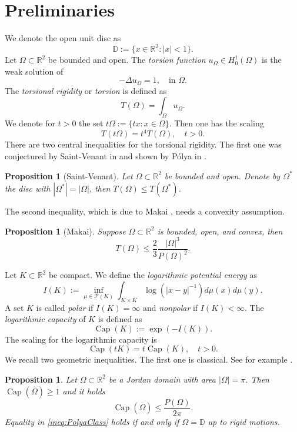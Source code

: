 \documentclass[11pt]{article}
\theoremstyle{plain}
\numberwithin{equation}{section}
\newtheorem{proposition}[theorem]{Proposition}
\theoremstyle{definition}
\DeclareMathOperator{\cp}{Cap}
\def \Om{\Omega}
\def \R {\mathbb{R}}
\def \mc{\mathcal}
\def \mb{\mathbb}
\begin{document}
    \section{Preliminaries}
    We denote the open unit disc as
    \[
    \mb D:=\{x\in \R^2:|x|<1\}.
    \]
    Let $\Om \subset \R^2$ be bounded and open. The \textit{torsion function} $u_\Om \in H^1_0(\Om)$ is the weak solution of
    \[
        -\Delta u_\Om=1,\quad \text{in }\Om.
    \]
    The \textit{torsional rigidity} or \textit{torsion} is defined as
    \[
    T(\Om)=\int_{\Om}u_\Om.
    \]
    We denote for $t>0$ the set $t\Om:=\{tx:x\in\Om\}$. Then one has the scaling
    \begin{equation}
        \label{scalingTorsion}
        T(t\Om)=t^4T(\Om),\quad t>0.
    \end{equation}
    There are two central inequalities for the torsional rigidity. The first one was conjectured by Saint-Venant in \cite{SaintVenant1856Torsion} and shown by Pólya in \cite{Plya1948TorsionalRP}.
    \begin{proposition}[Saint-Venant]
        \label{prop:SaintVenant}
        Let $\Om \subset \mb R^2$ be bounded and open. Denote by $\Om^*$ the disc with $|\Om^*|=|\Om|$, then $T(\Om)\leq T(\Om^*)$.
    \end{proposition}
    The second inequality, which is due to Makai \cite{Makai1962}, needs a convexity assumption.
    \begin{proposition}[Makai]
        \label{prop:Makai}
        Suppose $\Om \subset \R^2$ is bounded, open, and convex, then
        \[
        T(\Om)\leq \frac23 \frac{|\Om|^3}{P(\Om)^2}.
        \]
    \end{proposition}
    Let $K \subset \R^2$ be compact. We define the \textit{logarithmic potential energy} as
    \[
    I(K):=\inf_{\mu \in \mc P(K)}\int_{K\times K}\log(|x-y|^{-1})d\mu(x)d\mu(y).
    \]
    A set $K$ is called \textit{polar} if $I(K)=\infty$ and \textit{nonpolar} if $I(K)<\infty$. The \textit{logarithmic capacity} of $K$ is defined as
    \[
    \cp(K):=\exp(-I(K)).
    \]
    The scaling for the logarithmic capacity is
    \begin{equation}
        \label{scalingLogCap}
        \cp(tK)=t\cp(K),\quad t>0.
    \end{equation}
    We recall two geometric inequalities. The first one is classical. See for example \cite{duren2013menahem}.
    \begin{proposition}
        \label{prop:Polya}
    Let $\Om \subset \R^2$ be a Jordan domain with area $|\Om|=\pi$. Then $\cp(\overline \Om)\geq 1$ and it holds
    \begin{equation}
        \label{ineq:PolyaClass}
        \cp(\overline\Om)\leq \frac{P(\Om)}{2\pi}.
    \end{equation}
    Equality in \eqref{ineq:PolyaClass} holds if and only if $\Om=\mb D$ up to rigid motions.
    \end{proposition}
\end{document}
